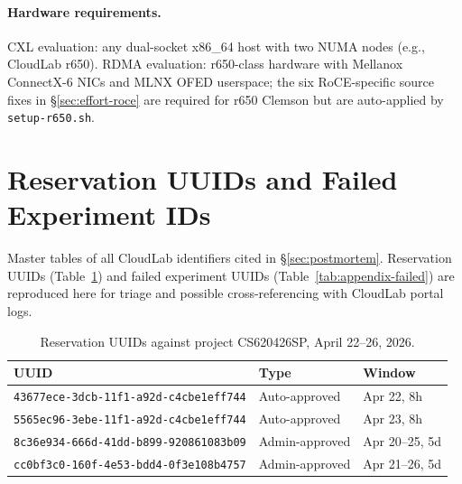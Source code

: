 \documentclass[11pt,a4paper]{article}
\begin{document}
\paragraph{Hardware requirements.} CXL evaluation: any dual-socket x86\_64 host with two NUMA nodes (e.g., CloudLab r650). RDMA evaluation: r650-class hardware with Mellanox ConnectX-6 NICs and MLNX OFED userspace; the six RoCE-specific source fixes in §\ref{sec:effort-roce} are required for r650 Clemson but are auto-applied by \texttt{setup-r650.sh}.

\section{Reservation UUIDs and Failed Experiment IDs}
\label{app:uuids}

Master tables of all CloudLab identifiers cited in §\ref{sec:postmortem}. Reservation UUIDs (Table~\ref{tab:appendix-reservations}) and failed experiment UUIDs (Table~\ref{tab:appendix-failed}) are reproduced here for triage and possible cross-referencing with CloudLab portal logs.

\begin{table}[H]
\centering
\small
\caption{Reservation UUIDs against project CS620426SP, April 22--26, 2026.}
\label{tab:appendix-reservations}
\begin{tabular}{@{}lll@{}}
\toprule
UUID & Type & Window \\
\midrule
\texttt{43677ece-3dcb-11f1-a92d-c4cbe1eff744} & Auto-approved & Apr 22, 8h \\
\texttt{5565ec96-3ebe-11f1-a92d-c4cbe1eff744} & Auto-approved & Apr 23, 8h \\
\texttt{8c36e934-666d-41dd-b899-920861083b09} & Admin-approved & Apr 20--25, 5d \\
\texttt{cc0bf3c0-160f-4e53-bdd4-0f3e108b4757} & Admin-approved & Apr 21--26, 5d \\
\bottomrule
\end{tabular}
\end{table}
\end{document}
